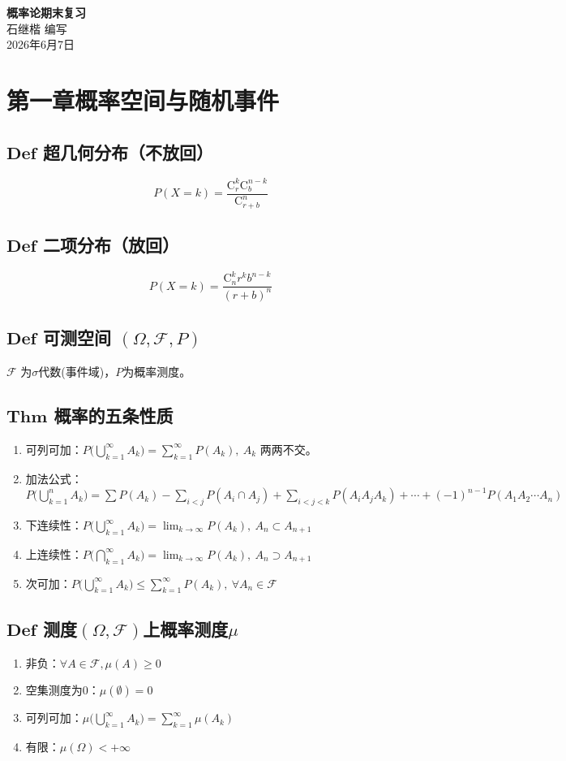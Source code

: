 \documentclass{article}
\begin{document}
	
	\begin{center}
		{\LARGE \textbf{概率论期末复习}} \\[0.5cm]
		{\large {\kaishu 石继楷 \quad 编写}} \\[0.3cm]
		{\large 2026年6月7日}
	\end{center}
	
	\section{第一章\quad 概率空间与随机事件}
	\subsection{$\bm{Def}$ 超几何分布（不放回）}
	\[
	P(X=k)=\frac{\mathrm{C}_r^k \mathrm{C}_b^{n-k}}{\mathrm{C}_{r+b}^n}
	\]
	\subsection{$\bm{Def}$ 二项分布（放回）}
	\[
	P(X=k)=\frac{\mathrm{C}_n^k r^k b^{n-k}}{(r+b)^n}
	\]
	\subsection{$\bm{Def}$ 可测空间 $(\Omega,\mathcal{F},P)$}
	$\mathcal{F}$ 为$\sigma$代数(事件域)，$P$为概率测度。
	\subsection{$\bm{Thm}$ 概率的五条性质}
	\begin{enumerate}
		\item 可列可加：$P\Big(\bigcup_{k=1}^{\infty}A_k\Big)=\sum_{k=1}^{\infty}P(A_k),\ A_k$ 两两不交。
		\item 加法公式：$P\Big(\bigcup_{k=1}^nA_k\Big)=\sum P(A_k)-\sum_{i<j}P(A_i\cap A_j)+\sum_{i<j<k}P(A_iA_jA_k)+\cdots+(-1)^{n-1}P(A_1A_2\cdots A_n)$
		\item 下连续性：$P\Big(\bigcup_{k=1}^{\infty}A_k\Big)=\lim_{k\to\infty}P(A_k),\ A_n\subset A_{n+1}$
		\item 上连续性：$P\Big(\bigcap_{k=1}^{\infty}A_k\Big)=\lim_{k\to\infty}P(A_k),\ A_n\supset A_{n+1}$
		\item 次可加：$P\Big(\bigcup_{k=1}^{\infty}A_k\Big)\le\sum_{k=1}^{\infty}P(A_k),\ \forall A_n\in\mathcal{F}$
	\end{enumerate}
	\subsection{$\bm{Def}$ 测度$(\Omega,\mathcal{F})$上概率测度$\mu$}
	\begin{enumerate}
		\item 非负：$\forall A\in\mathcal{F},\mu(A)\ge0$
		\item 空集测度为$0$：$\mu(\emptyset)=0$
		\item 可列可加：$\mu\Big(\bigcup_{k=1}^{\infty}A_k\Big)=\sum_{k=1}^{\infty}\mu(A_k)$
		\item 有限：$\mu(\Omega)<+\infty$
	\end{enumerate}
\end{document}
